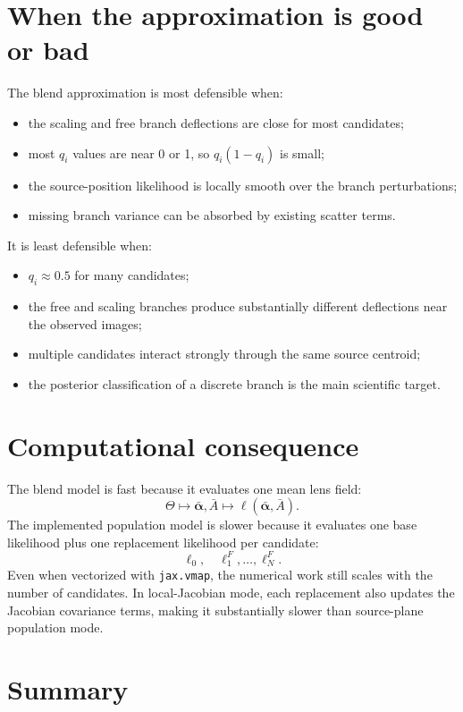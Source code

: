 \documentclass[11pt]{article}
\begin{document}
\section{When the approximation is good or bad}

The blend approximation is most defensible when:
\begin{itemize}
    \item the scaling and free branch deflections are close for most
    candidates;
    \item most $q_i$ values are near 0 or 1, so $q_i(1-q_i)$ is small;
    \item the source-position likelihood is locally smooth over the branch
    perturbations;
    \item missing branch variance can be absorbed by existing scatter terms.
\end{itemize}

It is least defensible when:
\begin{itemize}
    \item $q_i\approx 0.5$ for many candidates;
    \item the free and scaling branches produce substantially different
    deflections near the observed images;
    \item multiple candidates interact strongly through the same source
    centroid;
    \item the posterior classification of a discrete branch is the main
    scientific target.
\end{itemize}

\section{Computational consequence}

The blend model is fast because it evaluates one mean lens field:
\[
    \Theta \mapsto \bar{\bm{\alpha}},\bar{A}
    \mapsto
    \ell(\bar{\bm{\alpha}},\bar{A}).
\]
The implemented population model is slower because it evaluates one base
likelihood plus one replacement likelihood per candidate:
\[
    \ell_0,\quad \ell_1^F,\ldots,\ell_N^F.
\]
Even when vectorized with \texttt{jax.vmap}, the numerical work still scales
with the number of candidates. In local-Jacobian mode, each replacement also
updates the Jacobian covariance terms, making it substantially slower than
source-plane population mode.

\section{Summary}
\end{document}
